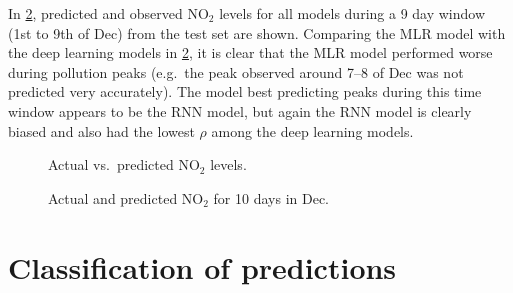 In \cref{fig:predictions}, predicted and observed NO$_2$ levels for all models during a 9 day window (1st to 9th of Dec) from the test set are shown. Comparing the MLR model with the deep learning models in \cref{fig:predictions}, it is clear that the MLR model performed worse during pollution peaks (e.g.\ the peak observed around 7--8 of Dec was not predicted very accurately). The model best predicting peaks during this time window appears to be the RNN model, but again the RNN model is clearly biased and also had the lowest $\rho$ among the deep learning models. 
 
\begin{figure}[h]
\centering
{}
\caption{Actual vs.\ predicted NO$_2$ levels. }
\label{fig:correlations}
\end{figure}

\begin{figure}[h]
\centering
{}
\caption{Actual and predicted NO$_2$ for 10 days in Dec.}
\label{fig:predictions}
\end{figure}

\clearpage
\section{Classification of predictions}

